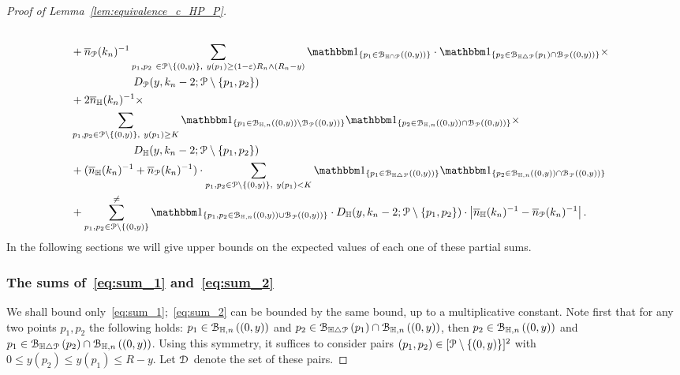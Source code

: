 \begin{proof}[Proof of Lemma~\ref{lem:equivalence_c_HP_P}]
\begin{align}
\\
&+\expP^{-1} \sum_{p_1,p_2 \ \in \Pcal \setminus \{(0,y) \}, \ y(p_1) \geq (1-\eps) R_n \wedge (R_n-y)} 
 \ind{p_1 \in \BallInter{(0,y)}} \cdot \ind{p_2 \in \BallSym{p_1}\cap \BallPo{(0,y)}}\times \nonumber \\
 &\hspace{2cm} D_\Pcal (y,k_n-2;\Pcal \setminus \{ p_1,p_2\}) \label{eq:sum_4}
\\
& + 2 \expH^{-1}\times \nonumber \\
&\sum_{p_1,p_2 \in\Pcal \setminus \{(0,y)\}, \ y(p_1) \geq K}\ind{p_1\in \BallHyp{(0,y)}\setminus \BallPo{(0,y)}} \ind{p_2\in \BallHyp{(0,y)}\cap \BallPo{(0,y)}}  \times \nonumber \\
& \hspace{2cm} D_\H (y,k_n-2;\Pcal \setminus \{ p_1,p_2\}) \label{eq:sum_5}\\
&+ (\expH^{-1}+\expP^{-1}) \cdot \sum_{p_1,p_2 \in\Pcal \setminus \{(0,y)\}, \ y(p_1) < K}
\ind{p_1\in \BallSym{(0,y)}} \ind{p_2\in \BallHyp{(0,y)}\cap \BallPo{(0,y)}} \label{eq:sum_6}\\
& +  \sum_{p_1,p_2 \in \Pcal \setminus \{(0,y)\}}^{\not =} \ind{p_1,p_2 \in \BallHyp{(0,y)}\cup \BallPo{(0,y)}} \cdot 
D_{\H}(y,k_n-2; \Pcal \setminus \{ p_1,p_2\})  \cdot 
\left| \expH^{-1} - \expP^{-1} \right|.  \label{eq:sum_7}
\end{align}
In the following sections we will give upper bounds on the expected values of each one of these partial sums. 

\subsubsection{The sums of~\eqref{eq:sum_1} and~\eqref{eq:sum_2}}

We shall bound only~\eqref{eq:sum_1};~\eqref{eq:sum_2} can be bounded by the same bound, up to a multiplicative constant. 
Note first that for any two points $p_1,p_2$ the following holds: $p_1 \in {\mathcal B}_{\mathbb{H},n}\left((0,y)\right)$ and $p_2 \in {\mathcal B}_{\mathbb{H} \bigtriangleup {\mathcal P}}\left(p_1\right)\cap {\mathcal B}_{\mathbb{H},n}\left((0,y)\right)$, then $p_2 \in {\mathcal B}_{\mathbb{H},n}\left((0,y)\right)$ and $p_1 \in {\mathcal B}_{\mathbb{H} \bigtriangleup {\mathcal P}}\left(p_2\right)\cap {\mathcal B}_{\mathbb{H},n}\left((0,y)\right)$.
Using this symmetry, it suffices to consider pairs $(p_1,p_2) \in [{\mathcal P} \setminus \{(0,y)\} ]^2$ with $0\leq y(p_2) \leq y(p_1) \leq R- y$.  
Let $\mathcal{D}_{}$ denote the set of these pairs. 


\end{proof}
